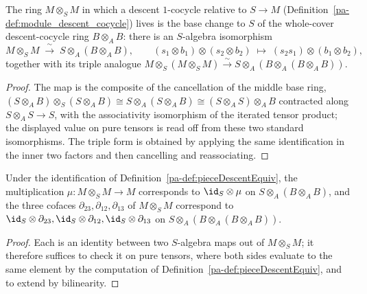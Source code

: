 \begin{definition}
  \label{pa-def:pieceDescentEquiv}
  \leanok

  The ring \(M \otimes_S M\) in which a descent \(1\)-cocycle relative to \(S \to M\)
  (Definition~\ref{pa-def:module_descent_cocycle}) lives is the base change to \(S\) of the whole-cover
  descent-cocycle ring \(B \otimes_A B\): there is an \(S\)-algebra isomorphism
  \[
    M \otimes_S M \;\xrightarrow{\ \sim\ }\; S \otimes_A (B \otimes_A B), \qquad
    (s_1 \otimes b_1) \otimes (s_2 \otimes b_2) \;\longmapsto\; (s_2 s_1) \otimes (b_1 \otimes b_2),
  \]
  together with its triple analogue \(M \otimes_S (M \otimes_S M) \xrightarrow{\sim} S \otimes_A (B
  \otimes_A (B \otimes_A B))\).
\end{definition}
\begin{proof}
  \leanok
  The map is the composite of the cancellation of the middle base ring, \((S \otimes_A B)
  \otimes_S (S \otimes_A B) \cong S \otimes_A (S \otimes_A B) \cong (S \otimes_A S) \otimes_A B\)
  contracted along \(S \otimes_A S \to S\), with the associativity isomorphism of the iterated
  tensor product; the displayed value on pure tensors is read off from these two standard
  isomorphisms. The triple form is obtained by applying the same identification in the inner two
  factors and then cancelling and reassociating.
\end{proof}

\begin{lemma}
  \label{pa-lem:pieceDescentEquiv_faces}
  \leanok

  Under the identification of Definition~\ref{pa-def:pieceDescentEquiv}, the multiplication
  \(\mu \colon M \otimes_S M \to M\) corresponds to \(\id_S \otimes \mu\) on \(S \otimes_A (B
  \otimes_A B)\), and the three cofaces \(\partial_{23}, \partial_{12}, \partial_{13}\) of \(M
  \otimes_S M\) correspond to \(\id_S \otimes \partial_{23}, \id_S \otimes \partial_{12}, \id_S
  \otimes \partial_{13}\) on \(S \otimes_A (B \otimes_A (B \otimes_A B))\).
\end{lemma}
\begin{proof}
  \leanok
  Each is an identity between two \(S\)-algebra maps out of \(M \otimes_S M\); it therefore suffices
  to check it on pure tensors, where both sides evaluate to the same element by the computation of
  Definition~\ref{pa-def:pieceDescentEquiv}, and to extend by bilinearity.
\end{proof}

